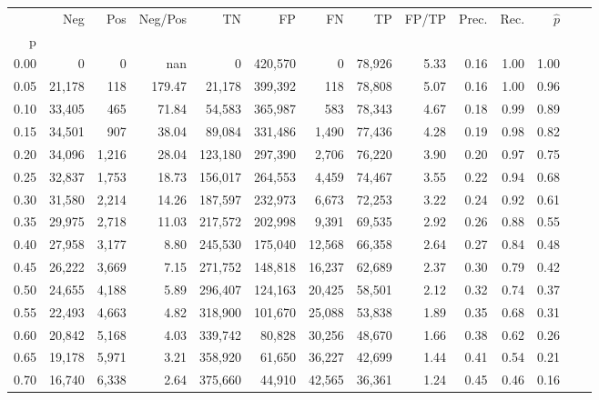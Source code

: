 \begin{tabular}{rrrrrrrrrrrrrr}
\toprule
{} &     Neg &    Pos & Neg/Pos &       TN &       FP &      FN &      TP & FP/TP & Prec. &  Rec. & $\hat{p}$ \\
p    &         &        &         &          &          &         &         &       &       &       &           \\
\midrule
0.00 &       0 &      0 &     nan &        0 &  420,570 &       0 &  78,926 &  5.33 &  0.16 &  1.00 &      1.00 \\
0.05 &  21,178 &    118 &  179.47 &   21,178 &  399,392 &     118 &  78,808 &  5.07 &  0.16 &  1.00 &      0.96 \\
0.10 &  33,405 &    465 &   71.84 &   54,583 &  365,987 &     583 &  78,343 &  4.67 &  0.18 &  0.99 &      0.89 \\
0.15 &  34,501 &    907 &   38.04 &   89,084 &  331,486 &   1,490 &  77,436 &  4.28 &  0.19 &  0.98 &      0.82 \\
0.20 &  34,096 &  1,216 &   28.04 &  123,180 &  297,390 &   2,706 &  76,220 &  3.90 &  0.20 &  0.97 &      0.75 \\
0.25 &  32,837 &  1,753 &   18.73 &  156,017 &  264,553 &   4,459 &  74,467 &  3.55 &  0.22 &  0.94 &      0.68 \\
0.30 &  31,580 &  2,214 &   14.26 &  187,597 &  232,973 &   6,673 &  72,253 &  3.22 &  0.24 &  0.92 &      0.61 \\
0.35 &  29,975 &  2,718 &   11.03 &  217,572 &  202,998 &   9,391 &  69,535 &  2.92 &  0.26 &  0.88 &      0.55 \\
0.40 &  27,958 &  3,177 &    8.80 &  245,530 &  175,040 &  12,568 &  66,358 &  2.64 &  0.27 &  0.84 &      0.48 \\
0.45 &  26,222 &  3,669 &    7.15 &  271,752 &  148,818 &  16,237 &  62,689 &  2.37 &  0.30 &  0.79 &      0.42 \\
0.50 &  24,655 &  4,188 &    5.89 &  296,407 &  124,163 &  20,425 &  58,501 &  2.12 &  0.32 &  0.74 &      0.37 \\
0.55 &  22,493 &  4,663 &    4.82 &  318,900 &  101,670 &  25,088 &  53,838 &  1.89 &  0.35 &  0.68 &      0.31 \\
0.60 &  20,842 &  5,168 &    4.03 &  339,742 &   80,828 &  30,256 &  48,670 &  1.66 &  0.38 &  0.62 &      0.26 \\
0.65 &  19,178 &  5,971 &    3.21 &  358,920 &   61,650 &  36,227 &  42,699 &  1.44 &  0.41 &  0.54 &      0.21 \\
0.70 &  16,740 &  6,338 &    2.64 &  375,660 &   44,910 &  42,565 &  36,361 &  1.24 &  0.45 &  0.46 &      0.16 \\

\end{tabular}
